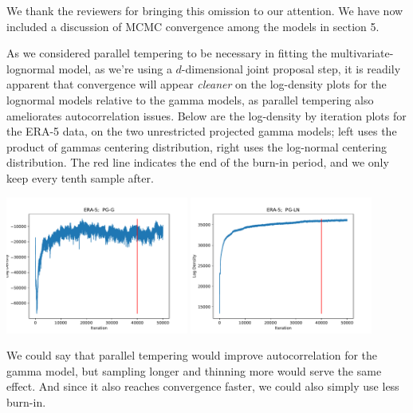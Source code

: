 \documentclass[10pt]{article}
\newcommand{\bruno}[1]{\textcolor{red}{#1}}
\begin{document}
\begin{itemize}
\begin{enumerate}
            We thank the reviewers for bringing this omission to our attention.  We have now
            included a discussion of MCMC convergence among the models in section 5.  

            As we considered parallel tempering to be necessary in fitting the multivariate-lognormal
            model, as we're using a $d$-dimensional joint proposal step, it is readily apparent that 
            convergence will appear \emph{cleaner} on the log-density plots for the lognormal models 
            relative to the gamma models, as parallel tempering also ameliorates autocorrelation
            issues.  Below are the log-density by iteration plots for the ERA-5 data, on the two 
            unrestricted projected gamma models; left uses the product of gammas centering distribution, 
            right uses the log-normal centering distribution.  The red line indicates the end of the 
            burn-in period, and we only keep every tenth sample after.
            
            \includegraphics[width=0.45\textwidth]{images/ERA-5-PG-G.pdf}
            \includegraphics[width=0.45\textwidth]{images/ERA-5-PG-LN.pdf}

            We could say that parallel tempering would improve autocorrelation for the gamma model,
            but sampling longer and thinning more would serve the same effect.  And since it also
            reaches convergence faster, we could also simply use less burn-in.
            


\end{enumerate}
\end{itemize}
\end{document}
